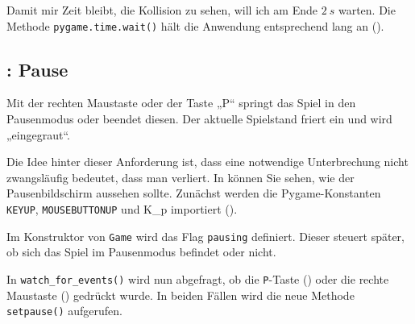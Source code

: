 
Damit mir Zeit bleibt, die Kollision zu sehen, will ich am Ende $2~s$ warten. Die Methode \texttt{pygame.time.wait()} hält die Anwendung entsprechend lang an ().



\subsection{: Pause}
 Mit der rechten Maustaste oder der Taste „P“ springt das Spiel in den Pausenmodus oder beendet diesen. Der aktuelle Spielstand friert ein und wird „eingegraut“. 
\er

Die Idee hinter dieser Anforderung ist, dass eine notwendige Unterbrechung nicht zwangsläufig bedeutet, dass man verliert. In  können Sie sehen, wie der Pausenbildschirm aussehen sollte.
Zunächst werden die Pygame-Konstanten \texttt{KEYUP}, \texttt{MOUSEBUTTONUP} und K\_p importiert ().



Im Konstruktor von \texttt{Game} wird das Flag \texttt{pausing} definiert. Dieser steuert später, ob sich das Spiel im Pausenmodus befindet oder nicht.


In \texttt{watch\_for\_events()} wird nun abgefragt, ob die \texttt{P}-Taste () oder die rechte Maustaste () gedrückt wurde. In beiden Fällen wird die neue Methode \texttt{setpause()} aufgerufen. 


